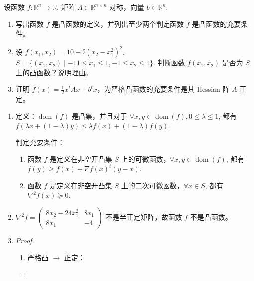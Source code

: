

\newcommand\Title{最优化习题}

\newcommand\subject{\operatorname{s.t.}}
\newcommand\dom{\operatorname{dom}} %

\renewcommand{\labelenumi}{(\arabic*)}


\begin{Problem}
    设函数 $f:\mathbb{R}^n\to \mathbb{R}$. 矩阵 $A \in \mathbb{R}^{n\times n}$ 对称，向量 $b \in \mathbb{R}^n$.
    \begin{enumerate}
        \item 写出函数 $f$ 是凸函数的定义，并列出至少两个判定函数 $f$ 是凸函数的充要条件。
        \item 设 $f(x_1, x_2) = 10 - 2(x_2 - x_1^2)^2$, $S = \{(x_1, x_2) \mid -11 \le x_1 \le 1, -1 \le x_2 \le 1\}$. 判断函数 $f(x_1, x_2)$ 是否为 $S$ 上的凸函数？说明理由。
        \item 证明 $f(x) = \frac{1}{2}x^tAx + b^tx$，为严格凸函数的充要条件是其 Hessian 阵 $A$ 正定。
    \end{enumerate}

    \Answer \text{} \begin{enumerate}
        \item 定义：$\dom(f)$ 是凸集，并且对于 $\forall x, y \in \dom(f), 0 \le \lambda \le 1$, 都有 $f(\lambda x + (1 - \lambda)y) \le \lambda f(x) + (1 - \lambda)f(y)$.
        
        判定充要条件：
        \begin{enumerate}
            \item 函数 $f$ 是定义在非空开凸集 $S$ 上的可微函数，$\forall x, y \in \dom(f)$, 都有 $f(y) \ge f(x) + \nabla f(x)^t(y - x)$.
            \item 函数 $f$ 是定义在非空开凸集 $S$ 上的二次可微函数，$\forall x \in S$, 都有 $\nabla^2f(x) \succeq 0$.
        \end{enumerate}
        \item $\nabla^2f = \begin{pmatrix}
            8x_2 - 24x_1^2 & 8x_1 \\
            8x_1 & -4
        \end{pmatrix}$ 不是半正定矩阵，故函数 $f$ 不是凸函数。
        \item \begin{proof}\text{}
            \begin{enumerate}
                \item 严格凸 $\to$ 正定：
                

\end{enumerate}
\end{proof}
\end{enumerate}
\end{Problem}
